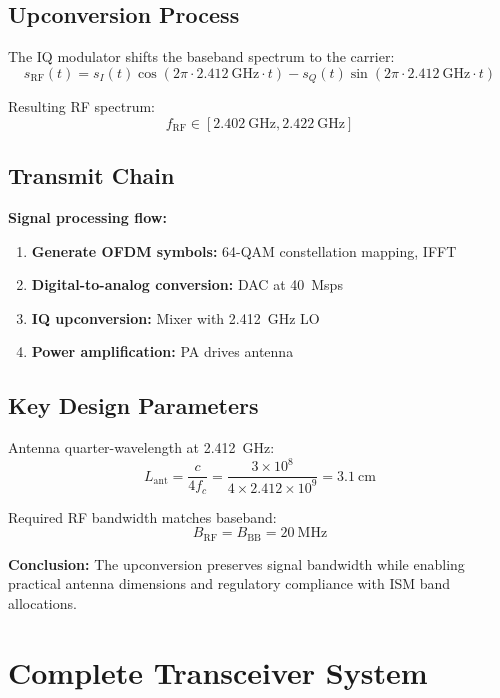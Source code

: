 \subsection{Upconversion Process}

The IQ modulator shifts the baseband spectrum to the carrier:
\begin{equation}
s_{\text{RF}}(t) = s_I(t)\cos(2\pi \cdot 2.412~\text{GHz} \cdot t) - s_Q(t)\sin(2\pi \cdot 2.412~\text{GHz} \cdot t)
\end{equation}

Resulting RF spectrum:
\begin{equation}
f_{\text{RF}} \in [2.402~\text{GHz}, 2.422~\text{GHz}]
\end{equation}

\subsection{Transmit Chain}

\textbf{Signal processing flow:}
\begin{enumerate}
\item \textbf{Generate OFDM symbols:} 64-QAM constellation mapping, IFFT
\item \textbf{Digital-to-analog conversion:} DAC at 40~Msps
\item \textbf{IQ upconversion:} Mixer with 2.412~GHz LO
\item \textbf{Power amplification:} PA drives antenna
\end{enumerate}

\subsection{Key Design Parameters}

Antenna quarter-wavelength at 2.412~GHz:
\begin{equation}
L_{\text{ant}} = \frac{c}{4f_c} = \frac{3 \times 10^8}{4 \times 2.412 \times 10^9} = 3.1~\text{cm}
\end{equation}

Required RF bandwidth matches baseband:
\begin{equation}
B_{\text{RF}} = B_{\text{BB}} = 20~\text{MHz}
\end{equation}

\textbf{Conclusion:} The upconversion preserves signal bandwidth while enabling practical antenna dimensions and regulatory compliance with ISM band allocations.

\section{Complete Transceiver System}

